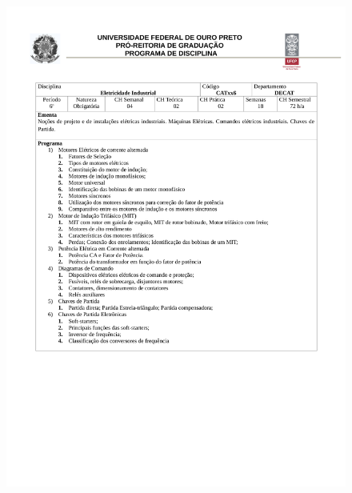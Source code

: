 \begin{figure}[p]
	\centering 
	\includegraphics[scale=0.7]{capitulos/anexo1-programas-disciplina/p64.pdf}
\end{figure}

